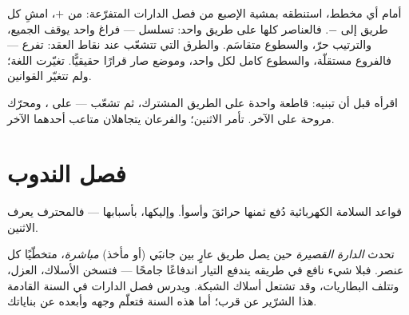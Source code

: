 \begin{example}\label{ex:g6:circuits-and-safety:reading}
أمام أي مخطط، استنطقه بمشية الإصبع من فصل الدارات المتفرّعة: من
$+$، امشِ كل طريق إلى $-$. فالعناصر كلها على طريق واحد: تسلسل
--- فراغ واحد يوقف الجميع، والترتيب حرّ، والسطوع متقاسَم.
والطرق التي تتشعّب عند نقاط العقد: تفرع --- فالفروع مستقلّة،
والسطوع كامل لكل واحد، وموضع  صار قرارًا حقيقيًّا.
تغيّرت اللغة؛ ولم تتغيّر القوانين.
\end{example}

\begin{omfigure}

{\small اقرأه قبل أن تبنيه: قاطعة واحدة على الطريق المشترك، ثم
تشعّب ---  على ، ومحرّك مروحة على الآخر.  تأمر
الاثنين؛ والفرعان يتجاهلان متاعب أحدهما الآخر.}
\end{omfigure}

\section{فصل الندوب}

قواعد السلامة الكهربائية دُفع ثمنها حرائقَ وأسوأ. وإليكها،
بأسبابها --- فالمحترف يعرف الاثنين.

\begin{definition}\label{def:g6:circuits-and-safety:short}
تحدث \emph{الدارة القصيرة} حين يصل طريق 
عارٍ بين جانبَي  (أو مأخذ) \emph{مباشرة}، متخطّيًا كل
عنصر. فبلا شيء نافع في طريقه يندفع التيار اندفاعًا جامحًا ---
فتسخن الأسلاك،  العزل، وتتلف البطاريات، وقد تشتعل أسلاك
الشبكة. ويدرس فصل الدارات في السنة القادمة هذا الشرّير عن قرب؛
أما هذه السنة فتعلّم وجهه وأبعده عن بناياتك.
\end{definition}

